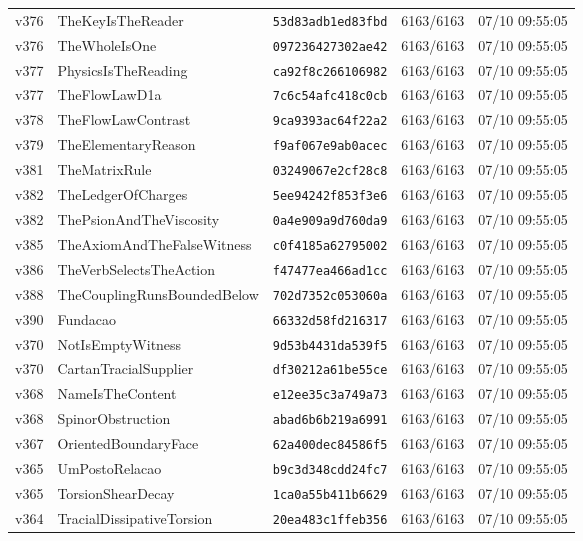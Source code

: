 \documentclass[11pt]{article}
\theoremstyle{definition}\newtheorem{deriv}{Derivação}
\begin{document}
{\begin{longtable}{@{}lllll@{}}
v376 & TheKeyIsTheReader & \texttt{53d83adb1ed83fbd} & 6163/6163 & 07/10 09:55:05 \\
v376 & TheWholeIsOne & \texttt{097236427302ae42} & 6163/6163 & 07/10 09:55:05 \\
v377 & PhysicsIsTheReading & \texttt{ca92f8c266106982} & 6163/6163 & 07/10 09:55:05 \\
v377 & TheFlowLawD1a & \texttt{7c6c54afc418c0cb} & 6163/6163 & 07/10 09:55:05 \\
v378 & TheFlowLawContrast & \texttt{9ca9393ac64f22a2} & 6163/6163 & 07/10 09:55:05 \\
v379 & TheElementaryReason & \texttt{f9af067e9ab0acec} & 6163/6163 & 07/10 09:55:05 \\
v381 & TheMatrixRule & \texttt{03249067e2cf28c8} & 6163/6163 & 07/10 09:55:05 \\
v382 & TheLedgerOfCharges & \texttt{5ee94242f853f3e6} & 6163/6163 & 07/10 09:55:05 \\
v382 & ThePsionAndTheViscosity & \texttt{0a4e909a9d760da9} & 6163/6163 & 07/10 09:55:05 \\
v385 & TheAxiomAndTheFalseWitness & \texttt{c0f4185a62795002} & 6163/6163 & 07/10 09:55:05 \\
v386 & TheVerbSelectsTheAction & \texttt{f47477ea466ad1cc} & 6163/6163 & 07/10 09:55:05 \\
v388 & TheCouplingRunsBoundedBelow & \texttt{702d7352c053060a} & 6163/6163 & 07/10 09:55:05 \\
v390 & Fundacao & \texttt{66332d58fd216317} & 6163/6163 & 07/10 09:55:05 \\
v370 & NotIsEmptyWitness & \texttt{9d53b4431da539f5} & 6163/6163 & 07/10 09:55:05 \\
v370 & CartanTracialSupplier & \texttt{df30212a61be55ce} & 6163/6163 & 07/10 09:55:05 \\
v368 & NameIsTheContent & \texttt{e12ee35c3a749a73} & 6163/6163 & 07/10 09:55:05 \\
v368 & SpinorObstruction & \texttt{abad6b6b219a6991} & 6163/6163 & 07/10 09:55:05 \\
v367 & OrientedBoundaryFace & \texttt{62a400dec84586f5} & 6163/6163 & 07/10 09:55:05 \\
v365 & UmPostoRelacao & \texttt{b9c3d348cdd24fc7} & 6163/6163 & 07/10 09:55:05 \\
v365 & TorsionShearDecay & \texttt{1ca0a55b411b6629} & 6163/6163 & 07/10 09:55:05 \\
v364 & TracialDissipativeTorsion & \texttt{20ea483c1ffeb356} & 6163/6163 & 07/10 09:55:05 \\

\end{longtable}}
\end{document}
